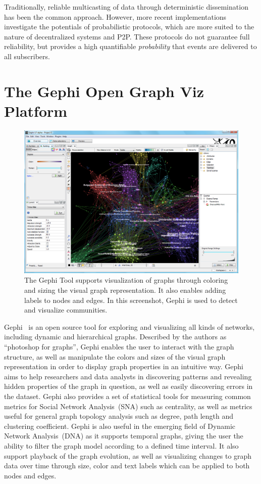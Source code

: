 Traditionally, reliable multicasting of data through deterministic
dissemination has been the common approach. However, more recent
implementations investigate the potentials of probabilistic protocols,
which are more suited to the nature of decentralized systems and P2P.
These protocols do not guarantee full reliability, but provides a high
quantifiable \emph{probability} that events are delivered to all
subscribers.

\section{The Gephi Open Graph Viz Platform}

\begin{figure}
    \centering
    \includegraphics[width=\textwidth]{img/gephi1}
    \caption{The Gephi Tool supports
        visualization of graphs through coloring and sizing the visual
        graph
        representation. It also enables adding labels to nodes and
        edges. In
        this screenshot, Gephi is used to detect and visualize
    communities.}
\label{img:gephi1}
\end{figure}

Gephi~\cite{ICWSM09154} is an open source tool for exploring and
visualizing all kinds of networks, including dynamic and hierarchical
graphs. Described by the authors as ``photoshop for graphs'', Gephi
enables the user to interact with the graph structure, as well as
manipulate the colors and sizes of the visual graph representation in
order to display graph properties in an intuitive way. Gephi aims to
help researchers and data analysts in discovering patterns and revealing
hidden properties of the graph in question, as well as easily
discovering errors in the dataset. Gephi also provides a set of
statistical tools for measuring common metrics for Social Network
Analysis~(SNA) such as centrality, as well as metrics useful for general
graph topology analysis such as degree, path length and clustering
coefficient. Gephi is also useful in the emerging field of Dynamic
Network Analysis~(DNA)  as it supports temporal graphs, giving the user
the ability to filter the graph model according to a defined time
interval. It also support playback of the graph evolution, as well as
visualizing changes to graph data over time through size, color and text
labels which can be applied to both nodes and edges.

